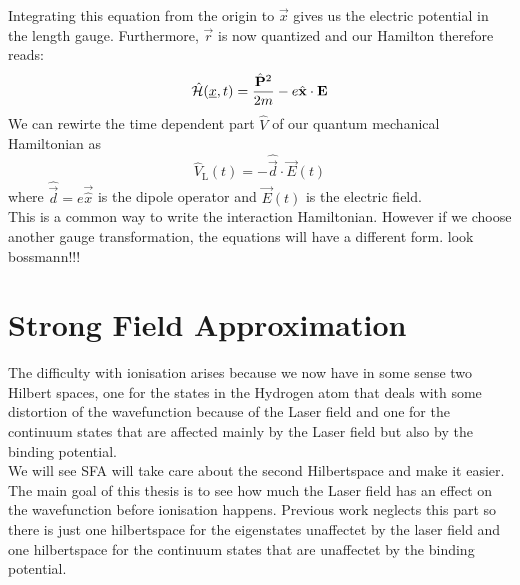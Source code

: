 Integrating this equation from the origin to $\vec{x}$ gives us the electric potential in the length gauge. Furthermore, $\vec{r}$ is now quantized and our Hamilton therefore reads:
\begin{equation*}
    \hat{\Hs}(\uvec{x}, t) = \frac{\hat{\vec{P}}^2}{2m} - e \hat{\vec{x}} \cdot \vec{E} %
\end{equation*}
We can rewirte the time dependent part $\hat{V}$ of our quantum mechanical Hamiltonian as
\begin{equation}
    \hat{V}_{\mathrm{L}}(t) = -\hat{\vec{d}} \cdot \vec{E}(t) \label{eq:dipoleApprox}
\end{equation}
where $\hat{\vec{d}}=e\vec{\hat{x}}$ is the dipole operator and $\vec{E}(t)$ is the electric field.\\
This is a common way to write the interaction Hamiltonian. 
However if we choose another gauge transformation, the equations will have a different form. look bossmann!!!










\newpage
\section{Strong Field Approximation}
The difficulty with ionisation arises because we now have in some sense two Hilbert spaces, one for the states in the Hydrogen atom that deals with some distortion of the wavefunction because of the Laser field and one for the continuum states that are affected mainly by the Laser field but also by the binding potential.\\
We will see SFA will take care about the second Hilbertspace and make it easier. 
The main goal of this thesis is to see how much the Laser field has an effect on the wavefunction before ionisation happens. 
Previous work neglects this part so there is just one hilbertspace for the eigenstates unaffectet by the laser field and one hilbertspace for the continuum states that are unaffectet by the binding potential.











